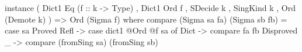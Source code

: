 \begin{code}
instance ( Dict1 Eq  (f :: k -> Type)
         , Dict1 Ord f
         , SDecide k
         , SingKind k
         , Ord (Demote k)
         ) => Ord (Sigma f) where
  compare (Sigma sa fa) (Sigma sb fb) =
    case sa %
      Proved Refl ->
        case dict1 @Ord @f sa of
          Dict -> compare fa fb
      Disproved _ ->
        compare (fromSing sa) (fromSing sb)
\end{code}
